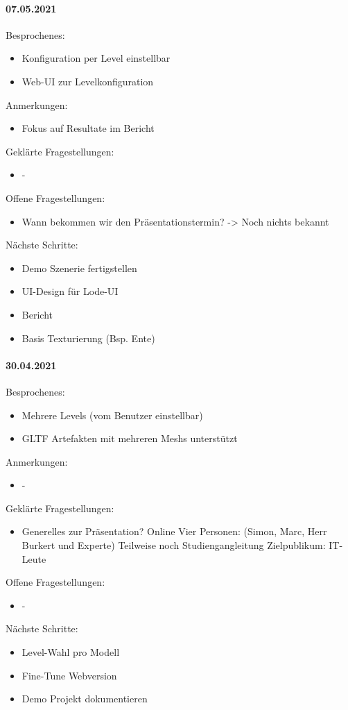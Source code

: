 \paragraph{07.05.2021}
Besprochenes:
\begin{itemize}
  \item Konfiguration per Level einstellbar
  \item Web-UI zur Levelkonfiguration
\end{itemize}
Anmerkungen:
\begin{itemize}
  \item Fokus auf Resultate im Bericht
\end{itemize}
Geklärte Fragestellungen:
\begin{itemize}
  \item -
\end{itemize}
Offene Fragestellungen:
\begin{itemize}
  \item Wann bekommen wir den Präsentationstermin? -> Noch nichts bekannt
\end{itemize}
Nächste Schritte:
\begin{itemize}
  \item Demo Szenerie fertigstellen
  \item UI-Design für Lode-UI
  \item Bericht
  \item Basis Texturierung (Bsp. Ente)
\end{itemize}

\newpage

\paragraph{30.04.2021}
Besprochenes:
\begin{itemize}
  \item Mehrere Levels (vom Benutzer einstellbar)
  \item GLTF Artefakten mit mehreren Meshs unterstützt
\end{itemize}
Anmerkungen:
\begin{itemize}
  \item -
\end{itemize}
Geklärte Fragestellungen:
\begin{itemize}
  \item Generelles zur Präsentation?
    \subitem Online
    \subitem Vier Personen: (Simon, Marc, Herr Burkert und Experte)
    \subitem Teilweise noch Studiengangleitung
    \subitem Zielpublikum: IT-Leute
\end{itemize}
Offene Fragestellungen:
\begin{itemize}
  \item -
\end{itemize}
Nächste Schritte:
\begin{itemize}
  \item Level-Wahl pro Modell
  \item Fine-Tune Webversion
  \item Demo Projekt dokumentieren
\end{itemize}

